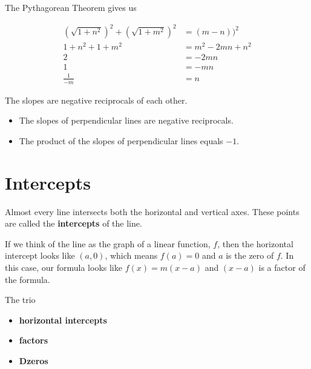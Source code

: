 \documentclass{ximera}
\begin{document}
The Pythagorean Theorem gives us


\begin{align*}
\left(\sqrt{1 + n^2}\right)^2 + \left(\sqrt{1 + m^2}\right)^2 & = (m-n))^2 \\
1 + n^2 + 1 + m^2 & = m^2 - 2 m n + n^2  \\
2 & = -2 m n \\
1 & = -m n \\
\frac{1}{-m} & = n
\end{align*}

The slopes are negative reciprocals of each other. \\


\begin{itemize}
\item The slopes of perpendicular lines are negative reciprocals.
\item The product of the slopes of perpendicular lines equals $-1$.
\end{itemize}



















\section{Intercepts}


Almost every line intersects both the horizontal and vertical axes.  These points are called the \textbf{intercepts} of the line.  

If we think of the line as the graph of a linear function, $f$, then the horizontal intercept looks like $(a, 0)$, which means $f(a)=0$ and $a$ is the zero of $f$. In this case, our formula looks like $f(x) = m (x-a)$ and $(x - a)$ is a factor of the formula.



The trio 

\begin{itemize}
\item \textbf{\textcolor{blue!55!black}{horizontal intercepts}} 
\item \textbf{\textcolor{blue!55!black}{factors}} 
\item \textbf{\textcolor{blue!55!black}{Dzeros}} 
\end{itemize}
\end{document}
